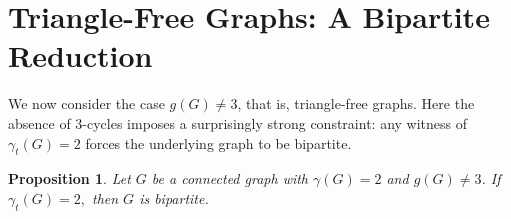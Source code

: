 \documentclass[12pt]{amsart}
\theoremstyle{plain}
\newtheorem{proposition}[theorem]{Proposition}
\theoremstyle{definition}
\begin{document}

\section{Triangle-Free Graphs: A Bipartite Reduction}

We now consider the case $g(G)\neq 3$, that is, triangle-free graphs. Here the absence of $3$-cycles imposes a surprisingly strong constraint: any witness of $\gamma_t(G)=2$ forces the underlying graph to be bipartite.

\begin{proposition}\label{prop:Td=2-bipartite}
Let $G$ be a connected graph with $\gamma(G)=2$ and $g(G)\neq 3$. If $\gamma_t(G)=2,$ then $G$ is bipartite.
\end{proposition}
\end{document}
